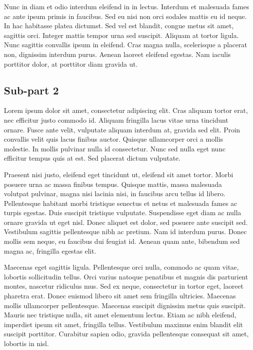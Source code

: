 \documentclass[a4paper,15pt]{article}
\begin{document}
Nunc in diam et odio interdum eleifend in in lectus. Interdum et malesuada fames ac ante ipsum primis in faucibus. Sed eu nisi non orci sodales mattis eu id neque. In hac habitasse platea dictumst. Sed vel est blandit, congue metus sit amet, sagittis orci. Integer mattis tempor urna sed suscipit. Aliquam at tortor ligula. Nunc sagittis convallis ipsum in eleifend. Cras magna nulla, scelerisque a placerat non, dignissim interdum purus. Aenean laoreet eleifend egestas. Nam iaculis porttitor dolor, at porttitor diam gravida ut.

\subsection{Sub-part 2}

Lorem ipsum dolor sit amet, consectetur adipiscing elit. Cras aliquam tortor erat, nec efficitur justo commodo id. Aliquam fringilla lacus vitae urna tincidunt ornare. Fusce ante velit, vulputate aliquam interdum at, gravida sed elit. Proin convallis velit quis lacus finibus auctor. Quisque ullamcorper orci a mollis molestie. In mollis pulvinar nulla id consectetur. Nunc sed nulla eget nunc efficitur tempus quis at est. Sed placerat dictum vulputate.

Praesent nisi justo, eleifend eget tincidunt ut, eleifend sit amet tortor. Morbi posuere urna ac massa finibus tempus. Quisque mattis, massa malesuada volutpat pulvinar, magna nisi lacinia nisi, in faucibus arcu tellus id libero. Pellentesque habitant morbi tristique senectus et netus et malesuada fames ac turpis egestas. Duis suscipit tristique vulputate. Suspendisse eget diam ac nulla ornare gravida ut eget nisl. Donec aliquet est dolor, sed posuere ante suscipit sed. Vestibulum sagittis pellentesque nibh ac pretium. Nam id interdum purus. Donec mollis sem neque, eu faucibus dui feugiat id. Aenean quam ante, bibendum sed magna ac, fringilla egestas elit.

Maecenas eget sagittis ligula. Pellentesque orci nulla, commodo ac quam vitae, lobortis sollicitudin tellus. Orci varius natoque penatibus et magnis dis parturient montes, nascetur ridiculus mus. Sed ex neque, consectetur in tortor eget, laoreet pharetra erat. Donec euismod libero sit amet sem fringilla ultricies. Maecenas mollis ullamcorper pellentesque. Maecenas suscipit dignissim metus quis suscipit. Mauris nec tristique nulla, sit amet elementum lectus. Etiam ac nibh eleifend, imperdiet ipsum sit amet, fringilla tellus. Vestibulum maximus enim blandit elit suscipit porttitor. Curabitur sapien odio, gravida pellentesque consequat sit amet, lobortis in nisl.
\end{document}
